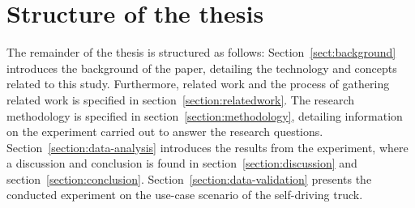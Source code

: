 
\section{Structure of the thesis}
The remainder of the thesis is structured as follows: Section~\ref{sect:background} introduces the background of the paper, detailing the technology and concepts related to this study. Furthermore, related work and the process of gathering related work is specified in section~\ref{section:relatedwork}. The research methodology is specified in section~\ref{section:methodology}, detailing information on the experiment carried out to answer the research questions. Section~\ref{section:data-analysis} introduces the results from the experiment, where a discussion and conclusion is found in section~\ref{section:discussion} and section~\ref{section:conclusion}. Section~\ref{section:data-validation} presents the conducted experiment on the use-case scenario of the self-driving truck. 

